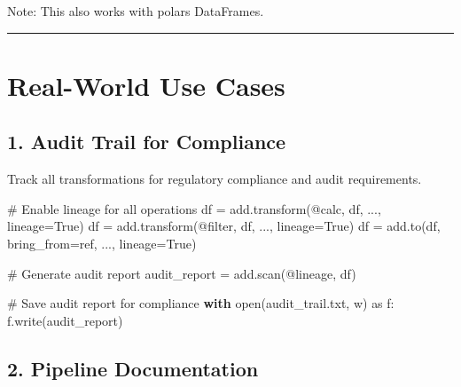 \documentclass[
  letterpaper,
]{scrbook}
\newenvironment{Shaded}{\begin{snugshade}}{\end{snugshade}}
\newcommand{\BuiltInTok}[1]{\textcolor[rgb]{0.00,0.23,0.31}{#1}}
\newcommand{\CommentTok}[1]{\textcolor[rgb]{0.37,0.37,0.37}{#1}}
\newcommand{\ControlFlowTok}[1]{\textcolor[rgb]{0.00,0.23,0.31}{\textbf{#1}}}
\newcommand{\ImportTok}[1]{\textcolor[rgb]{0.00,0.46,0.62}{#1}}
\newcommand{\NormalTok}[1]{\textcolor[rgb]{0.00,0.23,0.31}{#1}}
\newcommand{\OperatorTok}[1]{\textcolor[rgb]{0.37,0.37,0.37}{#1}}
\newcommand{\StringTok}[1]{\textcolor[rgb]{0.13,0.47,0.30}{#1}}
\newcommand{\VariableTok}[1]{\textcolor[rgb]{0.07,0.07,0.07}{#1}}
\begin{document}
Note: This also works with polars DataFrames.

\begin{center}\rule{0.5\linewidth}{0.5pt}\end{center}

\section{Real-World Use Cases}\label{real-world-use-cases-1}

\subsection{1. Audit Trail for
Compliance}\label{audit-trail-for-compliance}

Track all transformations for regulatory compliance and audit
requirements.

\begin{Shaded}
\begin{Highlighting}[]
\CommentTok{\# Enable lineage for all operations}
\NormalTok{df }\OperatorTok{=}\NormalTok{ add.transform(}\StringTok{\textquotesingle{}@calc\textquotesingle{}}\NormalTok{, df, ..., lineage}\OperatorTok{=}\VariableTok{True}\NormalTok{)}
\NormalTok{df }\OperatorTok{=}\NormalTok{ add.transform(}\StringTok{\textquotesingle{}@filter\textquotesingle{}}\NormalTok{, df, ..., lineage}\OperatorTok{=}\VariableTok{True}\NormalTok{)}
\NormalTok{df }\OperatorTok{=}\NormalTok{ add.to(df, bring\_from}\OperatorTok{=}\NormalTok{ref, ..., lineage}\OperatorTok{=}\VariableTok{True}\NormalTok{)}

\CommentTok{\# Generate audit report}
\NormalTok{audit\_report }\OperatorTok{=}\NormalTok{ add.scan(}\StringTok{\textquotesingle{}@lineage\textquotesingle{}}\NormalTok{, df)}

\CommentTok{\# Save audit report for compliance}
\ControlFlowTok{with} \BuiltInTok{open}\NormalTok{(}\StringTok{\textquotesingle{}audit\_trail.txt\textquotesingle{}}\NormalTok{, }\StringTok{\textquotesingle{}w\textquotesingle{}}\NormalTok{) }\ImportTok{as}\NormalTok{ f:}
\NormalTok{    f.write(audit\_report)}
\end{Highlighting}
\end{Shaded}

\subsection{2. Pipeline Documentation}\label{pipeline-documentation}
\end{document}
